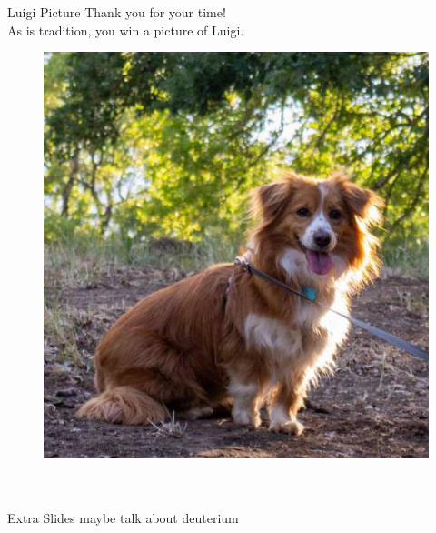 \documentclass[10pt,xcolor=svgnames,table]{beamer} %
\begin{document}
\begin{frame}[standout]{Luigi Picture}
    \vspace{-10pt}
    \Large Thank you for your time! \\
    \vspace{5pt} \normalsize As is tradition, you win a picture of Luigi.
     \begin{figure}
        \centering
        \includegraphics[scale = 0.3]{luigi-forestigi.png}
         \caption{\textcolor{white}{Luigi is very happy you sat through that and thanks you for your attention}}
    \end{figure}
\end{frame}
\appendix

\begin{frame}{Extra Slides}
\Large
maybe talk about deuterium
\end{frame}
\end{document}
